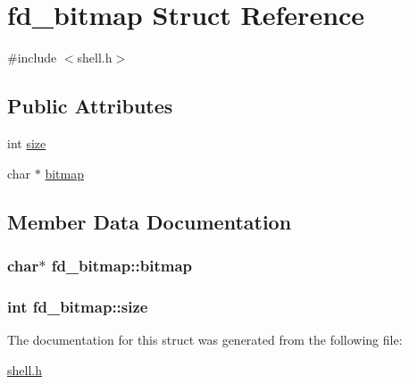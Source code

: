 \hypertarget{structfd__bitmap}{}\section{fd\+\_\+bitmap Struct Reference}
\label{structfd__bitmap}


{\ttfamily \#include $<$shell.\+h$>$}

\subsection*{Public Attributes}
\begin{DoxyCompactItemize}
\item 
int \hyperlink{structfd__bitmap_a28f1365151408dd4179cb4619df72025}{size}
\item 
char $\ast$ \hyperlink{structfd__bitmap_a2d08a1807d5a362717dc434518e7c7f6}{bitmap}
\end{DoxyCompactItemize}


\subsection{Member Data Documentation}
\subsubsection[{\texorpdfstring{bitmap}{bitmap}}]{\setlength{\rightskip}{0pt plus 5cm}char$\ast$ fd\+\_\+bitmap\+::bitmap}\hypertarget{structfd__bitmap_a2d08a1807d5a362717dc434518e7c7f6}{}\label{structfd__bitmap_a2d08a1807d5a362717dc434518e7c7f6}
\subsubsection[{\texorpdfstring{size}{size}}]{\setlength{\rightskip}{0pt plus 5cm}int fd\+\_\+bitmap\+::size}\hypertarget{structfd__bitmap_a28f1365151408dd4179cb4619df72025}{}\label{structfd__bitmap_a28f1365151408dd4179cb4619df72025}


The documentation for this struct was generated from the following file\+:\begin{DoxyCompactItemize}
\item 
\hyperlink{shell_8h}{shell.\+h}\end{DoxyCompactItemize}
